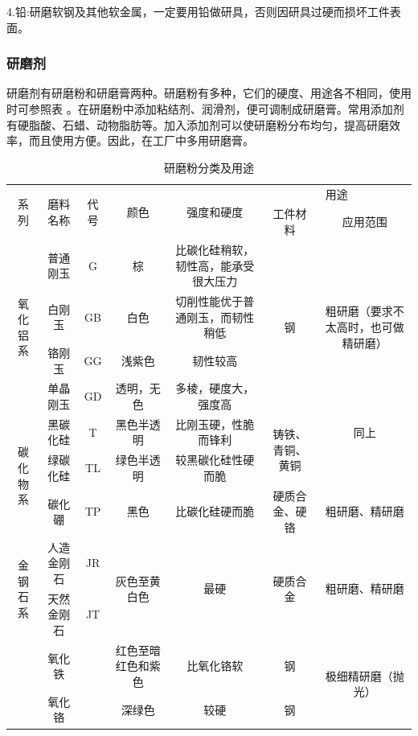 \documentclass{ctexbook}
\begin{document}
4.铅:研磨软钢及其他软金属，一定要用铅做研具，否则因研具过硬而损坏工件表面。
\subsubsection{研磨剂}
研磨剂有研磨粉和研磨膏两种。研磨粉有多种，它们的硬度、用途各不相同，使用时可参照表 。在研磨粉中添加粘结剂、润滑剂，便可调制成研磨膏。常用添加剂有硬脂酸、石蜡、动物脂肪等。加入添加剂可以使研磨粉分布均匀，提高研磨效率，而且使用方便。因此，在工厂中多用研磨膏。
\begin{table}[htbp]
	\centering
	\caption{研磨粉分类及用途}
	\begin{tabular}{c|c|c|c|c|c|c}
		\toprule
		\multirow{2}[4]{*}{系列} & \multirow{2}[4]{*}{磨料名称} & \multirow{2}[4]{*}{代号} & \multirow{2}[4]{*}{颜色} & \multirow{2}[4]{*}{强度和硬度} & \multicolumn{2}{c}{用途} \\
		\cmidrule{6-7}          &       &       &       &       & 工件材料  & 应用范围 \\
		\midrule
		\multirow{4}[8]{*}{氧化铝系} & 普通刚玉  & G     & 棕     & 比碳化硅稍软，韧性高，能承受很大压力 & \multirow{4}[8]{*}{钢} & \multirow{4}[8]{*}{粗研磨（要求不太高时，也可做精研磨）} \\
		\cmidrule{2-5}          & 白刚玉   & GB    & 白色    & 切削性能优于普通刚玉，而韧性稍低 &       &  \\
		\cmidrule{2-5}          & 铬刚玉   & GG    & 浅紫色   & 韧性较高  &       &  \\
		\cmidrule{2-5}          & 单晶刚玉  & GD    & 透明，无色 & 多棱，硬度大，强度高 &       &  \\
		\midrule
		\multirow{3}[6]{*}{碳化物系} & 黑碳化硅  & T     & 黑色半透明 & 比刚玉硬，性脆而锋利 & \multirow{2}[4]{*}{铸铁、青铜、黄铜} & 同上 \\
		\cmidrule{2-5}\cmidrule{7-7}          & 绿碳化硅  & TL    & 绿色半透明 & 较黑碳化硅性硬而脆 &       &  \\
		\cmidrule{2-7}          & 碳化硼   & TP    & 黑色    & 比碳化硅硬而脆 & 硬质合金、硬铬 & 粗研磨、精研磨 \\
		\midrule
		\multirow{2}[4]{*}{金钢石系} & 人造金刚石 & JR    & \multirow{2}[4]{*}{灰色至黄白色} & \multirow{2}[4]{*}{最硬} & \multirow{2}[4]{*}{硬质合金} & \multirow{2}[4]{*}{粗研磨、精研磨} \\
		\cmidrule{2-3}          & 天然金刚石 & JT    &       &       &       &  \\
		\midrule
		& 氧化铁   &       & 红色至暗红色和紫色 & 比氧化铬软 & 钢     & \multirow{2}[4]{*}{极细精研磨（抛光）} \\
		\cmidrule{1-6}          & 氧化铬   &       & 深绿色   & 较硬    & 钢     &  \\
		\bottomrule
	\end{tabular}%
	\label{tab:yanmofen}%
\end{table}%
\end{document}
